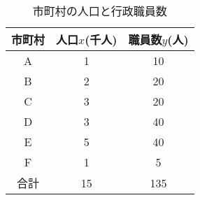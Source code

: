 \documentclass[12pt]{jarticle}
\begin{document}
\begin{table}[htb]
    \begin{center}
        \caption{市町村の人口と行政職員数}
        \begin{tabular}{|c|c|c|} \hline
            市町村 & 人口$x$(千人) & 職員数$y$(人) \\ \hline
            A      & 1             & 10            \\
            B      & 2             & 20            \\
            C      & 3             & 20            \\
            D      & 3             & 40            \\
            E      & 5             & 40            \\
            F      & 1             & 5             \\ \hline
            合計   & 15            & 135           \\\hline
        \end{tabular}
    \end{center}
\end{table}
\end{document}
